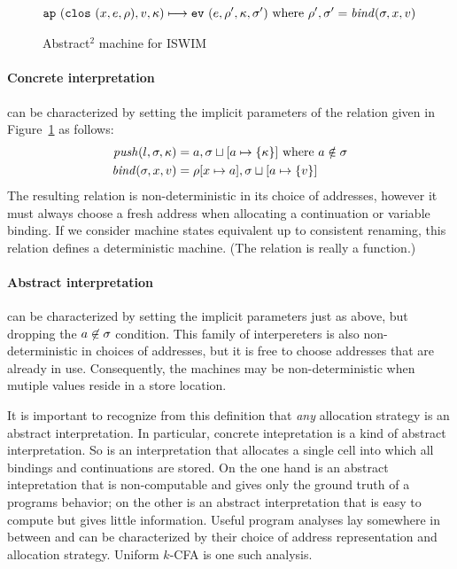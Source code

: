 \documentclass{llncs}
\begin{document}
\begin{figure}
\begin{align*}
\\[2mm]
{\tt ap\ }({{\tt clos\ }({x,e,\rho}),v,\kappa}) & \longmapsto
{\tt ev\ }({e,\rho',\kappa,\sigma'})
\text{ where }\rho',\sigma' = \mathit{bind}(\sigma,x,v)
\\
\end{align*}
\caption{Abstract$^2$ machine for ISWIM}
\label{fig:aam}
\end{figure}

\paragraph{Concrete interpretation} can be characterized by setting the implicit
parameters of the relation given in Figure~\ref{fig:aam} as follows:
\begin{align*}
\mathit{push}(l,\sigma,\kappa) &= a,\sigma\sqcup[a\mapsto\{\kappa\}]
\mbox{ where }a \notin\sigma
\\
\mathit{bind}(\sigma,x,v) &= \rho[x\mapsto a],\sigma\sqcup[a\mapsto\{v\}]
\end{align*}
The resulting relation is non-deterministic in its choice of
addresses, however it must always choose a fresh address when
allocating a continuation or variable binding.  If we consider machine
states equivalent up to consistent renaming, this relation defines
a deterministic machine.  (The relation is really a function.)


\paragraph{Abstract interpretation} can be characterized by setting the implicit
parameters just as above, but dropping the $a \not\in \sigma$
condition.  This family of interpereters is also non-deterministic in
choices of addresses, but it is free to choose addresses that are
already in use.  Consequently, the machines may be non-deterministic
when mutiple values reside in a store location.

It is important to recognize from this definition that \emph{any}
allocation strategy is an abstract interpretation.  In particular,
concrete intepretation is a kind of abstract interpretation.  So is an
interpretation that allocates a single cell into which all bindings
and continuations are stored.  On the one hand is an abstract
intepretation that is non-computable and gives only the ground truth
of a programs behavior; on the other is an abstract interpretation
that is easy to compute but gives little information.  Useful program
analyses lay somewhere in between and can be characterized by their
choice of address representation and allocation strategy.
Uniform \(k\)-CFA is one such analysis.
\end{document}
